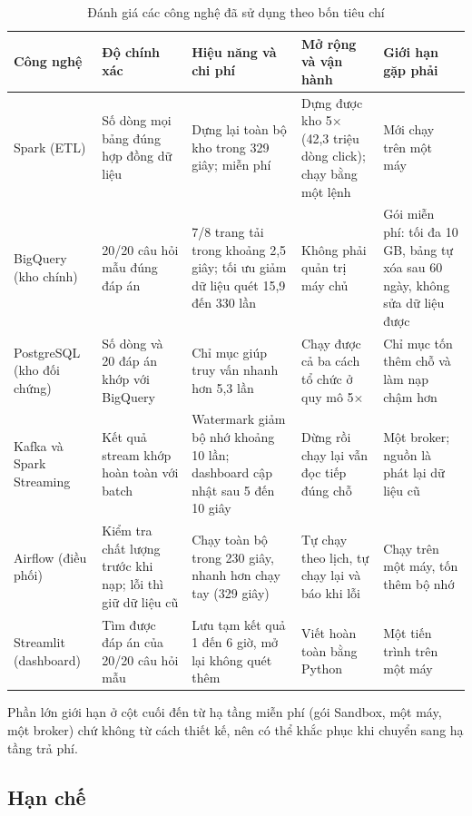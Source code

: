 \begin{table}[htbp]
\centering
\small
\begin{tabularx}{\textwidth}{|p{2.2cm}|X|X|X|X|}
\hline
\textbf{Công nghệ} & \textbf{Độ chính xác} & \textbf{Hiệu năng và chi phí} & \textbf{Mở rộng và vận hành} & \textbf{Giới hạn gặp phải} \\ \hline
Spark (ETL) & Số dòng mọi bảng đúng hợp đồng dữ liệu & Dựng lại toàn bộ kho trong 329 giây; miễn phí & Dựng được kho 5$\times$ (42,3 triệu dòng click); chạy bằng một lệnh & Mới chạy trên một máy \\ \hline
BigQuery (kho chính) & 20/20 câu hỏi mẫu đúng đáp án & 7/8 trang tải trong khoảng 2,5 giây; tối ưu giảm dữ liệu quét 15,9 đến 330 lần & Không phải quản trị máy chủ & Gói miễn phí: tối đa 10 GB, bảng tự xóa sau 60 ngày, không sửa dữ liệu được \\ \hline
PostgreSQL (kho đối chứng) & Số dòng và 20 đáp án khớp với BigQuery & Chỉ mục giúp truy vấn nhanh hơn 5,3 lần & Chạy được cả ba cách tổ chức ở quy mô 5$\times$ & Chỉ mục tốn thêm chỗ và làm nạp chậm hơn \\ \hline
Kafka và Spark Streaming & Kết quả stream khớp hoàn toàn với batch & Watermark giảm bộ nhớ khoảng 10 lần; dashboard cập nhật sau 5 đến 10 giây & Dừng rồi chạy lại vẫn đọc tiếp đúng chỗ & Một broker; nguồn là phát lại dữ liệu cũ \\ \hline
Airflow (điều phối) & Kiểm tra chất lượng trước khi nạp; lỗi thì giữ dữ liệu cũ & Chạy toàn bộ trong 230 giây, nhanh hơn chạy tay (329 giây) & Tự chạy theo lịch, tự chạy lại và báo khi lỗi & Chạy trên một máy, tốn thêm bộ nhớ \\ \hline
Streamlit (dashboard) & Tìm được đáp án của 20/20 câu hỏi mẫu & Lưu tạm kết quả 1 đến 6 giờ, mở lại không quét thêm & Viết hoàn toàn bằng Python & Một tiến trình trên một máy \\ \hline
\end{tabularx}
\caption{Đánh giá các công nghệ đã sử dụng theo bốn tiêu chí}
\label{tab:danh-gia-cong-nghe}
\end{table}

Phần lớn giới hạn ở cột cuối đến từ hạ tầng miễn phí (gói Sandbox, một máy, một broker) chứ không
từ cách thiết kế, nên có thể khắc phục khi chuyển sang hạ tầng trả phí.

\subsection{Hạn chế}
\label{sec:han-che}

